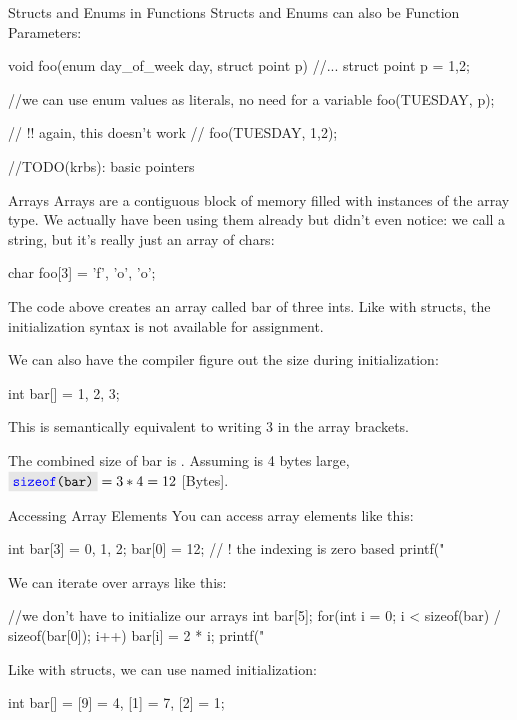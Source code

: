 \documentclass[10pt,graphics,aspectratio=169,table]{beamer}
\begin{document}
\begin{frame}[fragile]{Structs and Enums in Functions}
    Structs and Enums can also be Function Parameters:
    \begin{codeblock}
void foo(enum day_of_week day, struct point p){ 
    //...
}
struct point p = {1,2};

//we can use enum values as literals, no need for a variable
foo(TUESDAY, p);

// !! again, this doesn't work
// foo(TUESDAY, {1,2});

    \end{codeblock}
\end{frame}

//TODO(krbs): basic pointers

\begin{frame}[fragile]{Arrays}
    Arrays are a contiguous block of memory 
    filled with instances of the array type.
    We actually have been using them already but didn't even notice:
    we call  a string, but it's really just an array of chars:
    \begin{codeblock}
char foo[3] = {'f', 'o', 'o'};
    \end{codeblock} 

    The code above creates an array called bar of three ints.
    Like with structs, the initialization syntax is not available for
    assignment. 
    
    We can also have the compiler figure out the size during initialization:
    \begin{codeblock}
int bar[] = {1, 2, 3};
    \end{codeblock} 

    This is semantically equivalent to writing 3 in the array brackets.

    The combined size of bar is .
    Assuming  is 4 bytes large, $\code{sizeof(bar)} = 3 * 4 = 12$ [Bytes].
   
\end{frame}

\begin{frame}[fragile]{Accessing Array Elements}
    You can access array elements like this: 
    \begin{codeblock}
int bar[3] = {0, 1, 2};
bar[0] = 12; // ! the indexing is zero based
printf("%
    \end{codeblock}

    We can iterate over arrays like this: 
    \begin{codeblock}
//we don't have to initialize our arrays
int bar[5];
for(int i = 0; i < sizeof(bar) / sizeof(bar[0]); i++){
    bar[i] = 2 * i;
    printf("%
}    
    \end{codeblock}
  

    Like with structs, we can use named initialization: 
    \begin{codeblock}
int bar[] = {[9] = 4, [1] = 7, [2] = 1};
    \end{codeblock}
\end{frame}
\end{document}
